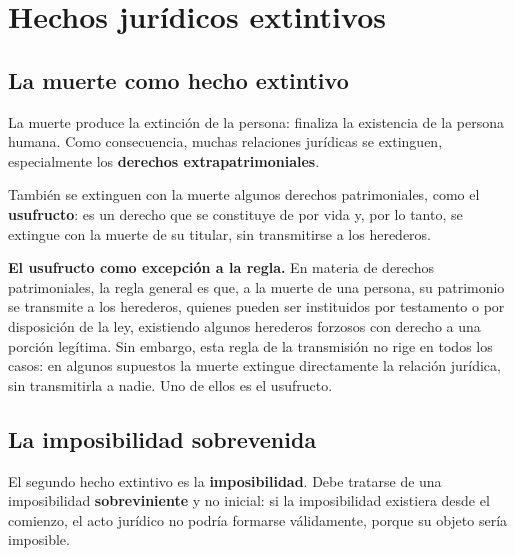 \documentclass[12pt,oneside]{book}
\begin{document}
\chapter[Hechos jurídicos extintivos]{Hechos jurídicos extintivos}

\section{La muerte como hecho extintivo}

La muerte produce la extinción de la persona: finaliza la existencia de la persona humana. Como consecuencia, muchas relaciones jurídicas se extinguen, especialmente los \textbf{derechos extrapatrimoniales}.

También se extinguen con la muerte algunos derechos patrimoniales, como el \textbf{usufructo}: es un derecho que se constituye de por vida y, por lo tanto, se extingue con la muerte de su titular, sin transmitirse a los herederos.

\begin{important}
\textbf{El usufructo como excepción a la regla.} En materia de derechos patrimoniales, la regla general es que, a la muerte de una persona, su patrimonio se transmite a los herederos, quienes pueden ser instituidos por testamento o por disposición de la ley, existiendo algunos herederos forzosos con derecho a una porción legítima. Sin embargo, esta regla de la transmisión no rige en todos los casos: en algunos supuestos la muerte extingue directamente la relación jurídica, sin transmitirla a nadie. Uno de ellos es el usufructo.
\end{important}

\section{La imposibilidad sobrevenida}

El segundo hecho extintivo es la \textbf{imposibilidad}. Debe tratarse de una imposibilidad \textbf{sobreviniente} y no inicial: si la imposibilidad existiera desde el comienzo, el acto jurídico no podría formarse válidamente, porque su objeto sería imposible.
\end{document}
